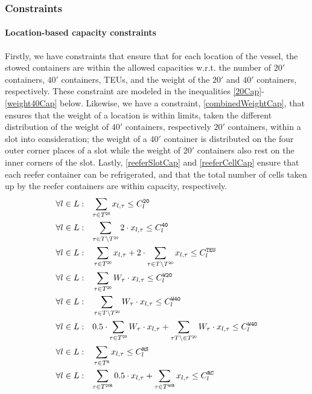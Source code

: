 \subsubsection*{Constraints}
\paragraph{Location-based capacity constraints}
Firstly, we have constraints that ensure that for each location of the vessel, the stowed containers are within the allowed capacities w.r.t. the number of $20'$ containers, $40'$ containers, TEUs, and the weight of the $20'$ and $40'$ containers, respectively. These constraint are modeled in the inequalities \eqref{20Cap}-\eqref{weight40Cap} below.
{Likewise, we have a constraint, \eqref{combinedWeightCap}, that ensures that the weight of a location is within limits, taken the different distribution of the weight of $40'$ containers, respectively $20'$ containers, within a slot into consideration; the weight of a $40'$ container is distributed on the four outer corner places of a slot while the weight of $20'$ containers also rest on the inner corners of the slot.}
Lastly, \eqref{reeferSlotCap} and \eqref{reeferCellCap} ensure that each reefer container can be refrigerated, and that {the total number of cells taken up by the reefer containers are within capacity}, respectively. 
\begin{align}
{\forall l \in L:}&\quad
	\label{20Cap}
	{\sum_{\tau \in T^{\texttt{20}}} x_{l,\tau} \leq C_l^{\texttt{20}} }\\
	\label{40Cap}    	
	{\forall l \in L:}&\quad
	{\sum_{\tau \in T\setminus T^{\texttt{20}}} 2\cdot x_{l,\tau} \leq C_l^{\texttt{40}} }\\
	\label{teuCap}
	\forall l \in L:&\quad
	\sum_{\tau \in T^{\texttt{20}}} x_{l,\tau} + 2\cdot\sum_{\tau \in T\setminus T^{\texttt{20}}} x_{l,\tau} \leq C_l^{\texttt{TEU}}\\
	\label{weight20Cap}
	\forall l \in L:&\quad
	\sum_{\tau \in T^{\texttt{20}}} W_\tau\cdot x_{l,\tau} \leq C_l^{\texttt{W20}}\\
	\label{weight40Cap}
	\forall l \in L:&\quad\sum_{\tau \in T\setminus T^{\texttt{20}}} W_\tau\cdot x_{l,\tau} \leq C_l^{\texttt{W40}} \\
	\label{combinedWeightCap}
	\forall l \in L:&\quad 0.5\cdot \sum_{\tau \in T^{\texttt{20}}} W_\tau\cdot x_{l,\tau} + \sum_{\tau T\setminus \in T^{\texttt{20}}		} W_\tau\cdot x_{l,\tau} \leq C_l^{\texttt{W40}}\\
	\label{reeferSlotCap}
	\forall l \in L:&\quad\sum_{\tau \in T^{\texttt{R}}} x_{l,\tau} \leq C_l^{\texttt{RS}} \\
	\label{reeferCellCap}
	{\forall l \in L:}&\quad
	{\sum_{\tau \in T^{\texttt{20R}}} 0.5\cdot x_{l,\tau} + \sum_{\tau \in T^{\texttt{40R}}} x_{l,\tau} \leq C_l^{\texttt{RC}} }
\end{align}	 
%

